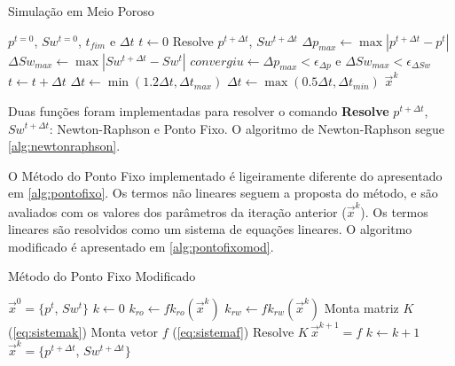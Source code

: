 \documentclass[final,5p]{elsarticle}
\numberwithin{equation}{section}
\begin{document}
        \begin{algorithm}
            \caption{Simulação em Meio Poroso}\label{alg:simulacao}
            \begin{algorithmic}
                \Require $p^{t=0}$, $Sw^{t=0}$, $t_{fim}$ e $\Delta t$
                \State $t \gets 0$
                \Repeat
                    \State Resolve $p^{t+\Delta t}$, $Sw^{t+\Delta t}$
                    \State $\Delta p_{max} \gets \max |p^{t+\Delta t} - p^t|$
                    \State $\Delta Sw_{max} \gets \max |Sw^{t+\Delta t} - Sw^t|$
                    \State $convergiu \gets \Delta p_{max} < \epsilon_{\Delta p}$ e $\Delta Sw_{max} < \epsilon_{\Delta Sw}$
                        \State $t \gets t + \Delta t$
                        \State $\Delta t \gets \min (1.2 \Delta t, \Delta t_{max})$
                    \Else
                        \State $\Delta t \gets \max (0.5 \Delta t, \Delta t_{min})$
                    \EndIf
                \State \Return $\vec{x}^{k}$
            \end{algorithmic}
        \end{algorithm}

        Duas funções foram implementadas para resolver o comando \textbf{Resolve} $p^{t+\Delta t}$, $Sw^{t+\Delta t}$: Newton-Raphson e Ponto Fixo. O algoritmo de Newton-Raphson segue \ref{alg:newtonraphson}.

        O Método do Ponto Fixo implementado é ligeiramente diferente do apresentado em \ref{alg:pontofixo}. Os termos não lineares seguem a proposta do método, e são avaliados com os valores dos parâmetros da iteração anterior ($\vec{x}^k$). Os termos lineares são resolvidos como um sistema de equações lineares. O algoritmo modificado é apresentado em \ref{alg:pontofixomod}.

        \begin{algorithm}
            \caption{Método do Ponto Fixo Modificado}\label{alg:pontofixomod}
            \begin{algorithmic}
                \Require $\vec{x}^0=\{p^{t}$, $Sw^{t}\}$
                \State $k \gets 0$
                \Repeat
                    \State $k_{ro} \gets fk_{ro}(\vec{x}^k)$
                    \State $k_{rw} \gets fk_{rw}(\vec{x}^k)$
                    \State Monta matriz $K$ (\ref{eq:sistemak})
                    \State Monta vetor $f$ (\ref{eq:sistemaf})
                    \State Resolve $K \, \vec{x}^{k+1} = f $
                    \State $k \gets k+1$
                \State \Return $\vec{x}^k=\{p^{t+\Delta t}$, $Sw^{t+\Delta t}\}$
            \end{algorithmic}
        \end{algorithm}
\end{document}
